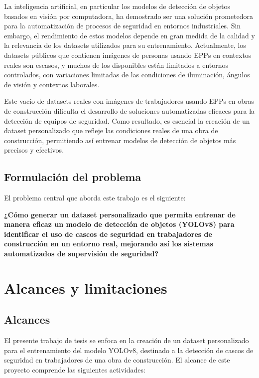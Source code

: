 La inteligencia artificial, en particular los modelos de detección de objetos basados en visión por computadora, ha demostrado ser una solución prometedora para la automatización de procesos de seguridad en entornos industriales. Sin embargo, el rendimiento de estos modelos depende en gran medida de la calidad y la relevancia de los datasets utilizados para su entrenamiento. Actualmente, los datasets públicos que contienen imágenes de personas usando EPPs en contextos reales son escasos, y muchos de los disponibles están limitados a entornos controlados, con variaciones limitadas de las condiciones de iluminación, ángulos de visión y contextos laborales.

Este vacío de datasets reales con imágenes de trabajadores usando EPPs en obras de construcción dificulta el desarrollo de soluciones automatizadas eficaces para la detección de equipos de seguridad. Como resultado, es esencial la creación de un dataset personalizado que refleje las condiciones reales de una obra de construcción, permitiendo así entrenar modelos de detección de objetos más precisos y efectivos.

\subsection{Formulación del problema}

El problema central que aborda este trabajo es el siguiente:

\textbf{¿Cómo generar un dataset personalizado que permita entrenar de manera eficaz un modelo de detección de objetos (YOLOv8) para identificar el uso de cascos de seguridad en trabajadores de construcción en un entorno real, mejorando así los sistemas automatizados de supervisión de seguridad?}

\section{Alcances y limitaciones}

\subsection{Alcances}

El presente trabajo de tesis se enfoca en la creación de un dataset personalizado para el entrenamiento del modelo YOLOv8, destinado a la detección de cascos de seguridad en trabajadores de una obra de construcción. El alcance de este proyecto comprende las siguientes actividades:

